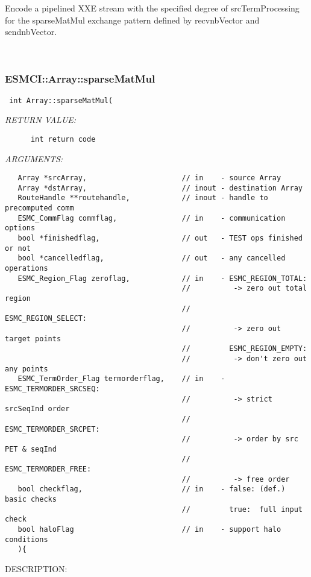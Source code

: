       Encode a pipelined XXE stream with the specified degree of
      srcTermProcessing for the sparseMatMul exchange pattern defined by
      recvnbVector and sendnbVector.
   
 
\mbox{}\hrulefill\
 
\subsubsection [ESMCI::Array::sparseMatMul] {ESMCI::Array::sparseMatMul}


  
\begin{verbatim} int Array::sparseMatMul(\end{verbatim}{\em RETURN VALUE:}
\begin{verbatim}      int return code\end{verbatim}{\em ARGUMENTS:}
\begin{verbatim}   Array *srcArray,                      // in    - source Array
   Array *dstArray,                      // inout - destination Array
   RouteHandle **routehandle,            // inout - handle to precomputed comm
   ESMC_CommFlag commflag,               // in    - communication options
   bool *finishedflag,                   // out   - TEST ops finished or not
   bool *cancelledflag,                  // out   - any cancelled operations
   ESMC_Region_Flag zeroflag,            // in    - ESMC_REGION_TOTAL:
                                         //          -> zero out total region
                                         //         ESMC_REGION_SELECT:
                                         //          -> zero out target points
                                         //         ESMC_REGION_EMPTY:
                                         //          -> don't zero out any points
   ESMC_TermOrder_Flag termorderflag,    // in    - ESMC_TERMORDER_SRCSEQ:
                                         //          -> strict srcSeqInd order
                                         //         ESMC_TERMORDER_SRCPET:
                                         //          -> order by src PET & seqInd
                                         //         ESMC_TERMORDER_FREE:
                                         //          -> free order
   bool checkflag,                       // in    - false: (def.) basic checks
                                         //         true:  full input check
   bool haloFlag                         // in    - support halo conditions
   ){\end{verbatim}
{\sf DESCRIPTION:\\ }


